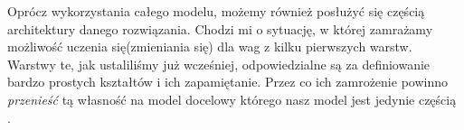Oprócz wykorzystania całego modelu, możemy również posłużyć się częścią architektury danego rozwiązania. Chodzi mi o sytuację, w której zamrażamy możliwość uczenia się(zmieniania się) dla wag z kilku pierwszych warstw. Warstwy te, jak ustaliliśmy już wcześniej, odpowiedzialne są za definiowanie bardzo prostych kształtów i ich zapamiętanie. Przez co ich zamrożenie powinno \textit{przenieść} tą własność na model docelowy którego nasz model jest jedynie częścią \cite{python_ml}.
























